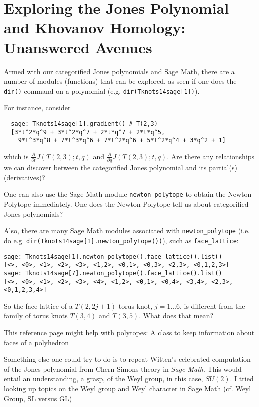 \documentclass[10pt]{amsart}
\begin{document}
\section{Exploring the Jones Polynomial and Khovanov Homology: Unanswered Avenues}

Armed with our categorified Jones polynomials and Sage Math, there are a number of modules (functions) that can be explored, as seen if one does the \verb|dir()| command on a polynomial (e.g. \verb|dir(Tknots14sage[1])|).  

For instance, consider 
\begin{lstlisting}
  sage: Tknots14sage[1].gradient() # T(2,3)
  [3*t^2*q^9 + 3*t^2*q^7 + 2*t*q^7 + 2*t*q^5,
    9*t^3*q^8 + 7*t^3*q^6 + 7*t^2*q^6 + 5*t^2*q^4 + 3*q^2 + 1]
\end{lstlisting}
which is $\frac{ \partial }{ \partial t} J(T(2,3);t,q)$ and $\frac{ \partial }{ \partial q} J(T(2,3);t,q)$.  Are there any relationships we can discover between the categorified Jones polynomial and its partial(s) (derivatives)?

One can also use the Sage Math module \verb|newton_polytope| to obtain the Newton Polytope immediately.  One does the Newton Polytope tell us about categorified Jones polynomials?

Also, there are many Sage Math modules associated with \verb|newton_polytope| (i.e. do e.g. \verb|dir(Tknots14sage[1].newton_polytope())|), such as \verb|face_lattice|:
\begin{lstlisting}
sage: Tknots14sage[1].newton_polytope().face_lattice().list()
[<>, <0>, <1>, <2>, <3>, <1,2>, <0,1>, <0,3>, <2,3>, <0,1,2,3>]
sage: Tknots14sage[7].newton_polytope().face_lattice().list()
[<>, <0>, <1>, <2>, <3>, <4>, <1,2>, <0,1>, <0,4>, <3,4>, <2,3>, <0,1,2,3,4>]
\end{lstlisting}
So the face lattice of a $T(2,2j+1)$ torus knot, $j=1\dots 6$, is different from the family of torus knots $T(3,4)$ and $T(3,5)$.  What does that mean?  

This reference page might help with polytopes: \href{http://doc.sagemath.org/html/en/reference/geometry/sage/geometry/polyhedron/face.html}{A class to keep information about faces of a polyhedron}

Something else one could try to do is to repeat Witten's celebrated computation of the Jones polynomial from Chern-Simons theory \cite{Witten:1988hf} in \emph{Sage Math}.  This would entail an understanding, a grasp, of the Weyl group, in this case, $SU(2)$.  I tried looking up topics on the Weyl group and Weyl character in Sage Math (cf. \href{http://doc.sagemath.org/html/en/reference/combinat/sage/combinat/root_system/weyl_group.html}{Weyl Group}, \href{https://www.math.ucdavis.edu/~anne/SQ2014/thematic_tutorials/lie/weyl_character_ring.html\#slvsgl}{SL versus GL})
\end{document}
